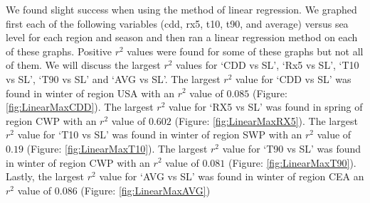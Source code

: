 \documentclass[12pt]{report}
\begin{document}
	\par We found slight success when using the method of linear regression. We graphed first each of the following variables (cdd, rx5, t10, t90, and average) versus sea level for each region and season and then ran a linear regression method on each of these graphs. Positive $r^2$ values were found for some of these graphs but not all of them. We will discuss the largest $r^2$ values for \textquoteleft CDD vs SL', \textquoteleft Rx5 vs SL', \textquoteleft T10 vs SL', \textquoteleft T90 vs SL' and \textquoteleft AVG vs SL'. The largest $r^2$ value for \textquoteleft CDD vs SL' was found in winter of region USA with an $r^2$ value of $0.085$ (Figure: \ref{fig:LinearMaxCDD}). The largest $r^2$ value for \textquoteleft RX5 vs SL' was found in spring of region CWP with an $r^2$ value of $0.602$ (Figure: \ref{fig:LinearMaxRX5}). The largest $r^2$ value for \textquoteleft T10 vs SL' was found in winter of region SWP with an $r^2$ value of $0.19$ (Figure: \ref{fig:LinearMaxT10}). The largest $r^2$ value for \textquoteleft T90 vs SL' was found in winter of region CWP with an $r^2$ value of $0.081$ (Figure: \ref{fig:LinearMaxT90}). Lastly, the largest $r^2$ value for \textquoteleft AVG vs SL' was found in winter of region CEA an $r^2$ value of $0.086$ (Figure: \ref{fig:LinearMaxAVG})
\end{document}
